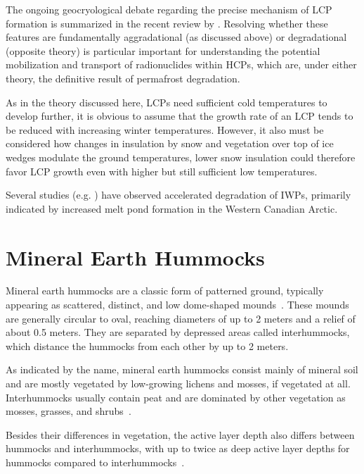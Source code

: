 The ongoing geocryological debate regarding the precise mechanism of LCP formation is summarized in the recent review by \citet{shurFormationLowCenteredIceWedge2025}. 
Resolving whether these features are fundamentally aggradational (as discussed above) or degradational (opposite theory) is particular important for understanding the potential mobilization and transport of radionuclides within HCPs, which are, under either theory, the definitive result of permafrost degradation.

As in the theory discussed here, LCPs need sufficient cold temperatures to develop further, it is obvious to assume that the growth rate of an LCP tends to be reduced with increasing winter temperatures. 
However, it also must be considered how changes in insulation by snow and vegetation over top of ice wedges modulate the ground temperatures, lower snow insulation could therefore favor LCP growth even with higher but still sufficient low temperatures.

Several studies (e.g. \citep{fraserRecentPondingUpland2023,steedmanSpatioTemporalVariationHighCentre2017}) have observed accelerated degradation of IWPs, primarily indicated by increased melt pond formation in the Western Canadian Arctic.

\section{Mineral Earth Hummocks}
Mineral earth hummocks are a classic form of patterned ground, typically appearing as scattered, distinct, and low dome-shaped mounds~\citep{kokeljStructureDynamicsEarth2007}. 
These mounds are generally circular to oval, reaching diameters of up to 2 meters and a relief of about 0.5 meters. 
They are separated by depressed areas called interhummocks, which distance the hummocks from each other by up to 2 meters.

As indicated by the name, mineral earth hummocks consist mainly of mineral soil and are mostly vegetated by low-growing lichens and mosses, if vegetated at all. 
Interhummocks usually contain peat and are dominated by other vegetation as mosses, grasses, and shrubs~\citep{dakinHowDryYear2023,kokeljStructureDynamicsEarth2007,quintonSubsurfaceDrainageHummockcovered2000}.

Besides their differences in vegetation, the active layer depth also differs between hummocks and interhummocks, with up to twice as deep active layer depths for hummocks compared to interhummocks~\citep{kokeljStructureDynamicsEarth2007}.

